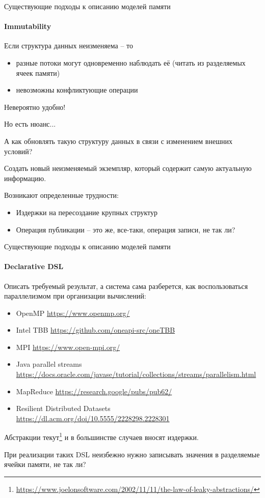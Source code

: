 \begin{frame}[fragile, t]{Существующие подходы к описанию моделей памяти}
\framesubtitle{Immutability}

Если структура данных неизменяема -- то 

\begin{itemize}
	\pause
	\item разные потоки могут одновременно наблюдать её (читать из разделяемых ячеек памяти)

	\pause
	\item невозможны конфликтующие операции	
\end{itemize}

\pause
Невероятно удобно!

\pause
Но есть нюанс...

\pause
А как обновлять такую структуру данных в связи с изменением внешних условий?

\pause
Создать новый неизменяемый экземпляр, который содержит самую актуальную информацию.

\pause
Возникают определенные трудности:
\begin{itemize}
	\pause
	\item Издержки на пересоздание крупных структур

	\pause
	\item Операция публикации -- это же, все-таки, операция записи, не так ли? 
\end{itemize}
\end{frame}

\begin{frame}[fragile, t]{Существующие подходы к описанию моделей памяти}
\framesubtitle{Declarative DSL}

Описать требуемый результат, а система сама разберется, как воспользоваться параллелизмом при организации вычислений:

\pause
\begin{itemize}
	\item OpenMP {\tiny\url{https://www.openmp.org/}}
	\item Intel TBB {\tiny\url{https://github.com/oneapi-src/oneTBB}}
	\item MPI {\tiny\url{https://www.open-mpi.org/}}
	\item Java parallel streams {\tiny\url{https://docs.oracle.com/javase/tutorial/collections/streams/parallelism.html}}
	\item MapReduce {\tiny\url{https://research.google/pubs/pub62/}}
	\item Resilient Distributed Datasets {\tiny\url{https://dl.acm.org/doi/10.5555/2228298.2228301}}
\end{itemize}

\pause
Абстракции текут\footnote<3->{\tiny\url{https://www.joelonsoftware.com/2002/11/11/the-law-of-leaky-abstractions/}} и в большинстве случаев вносят издержки.

\pause
При реализации таких DSL неизбежно нужно записывать значения в разделяемые ячейки памяти, не так ли?
\end{frame}


